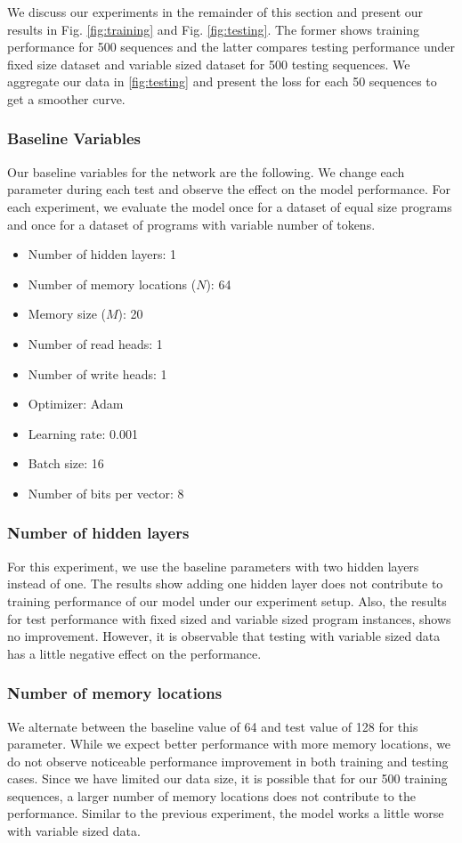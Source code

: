 \documentclass[acmsmall]{acmart}
\begin{document}
We discuss our experiments in the remainder of this section and present our results in Fig. \ref{fig:training} and Fig. \ref{fig:testing}. The former shows training performance for 500 sequences and the latter compares testing performance under fixed size dataset and variable sized dataset for 500 testing sequences. We aggregate our data in \ref{fig:testing} and present the loss for each 50 sequences to get a smoother curve.

\subsubsection{Baseline Variables}
Our baseline variables for the network are the following. We change each parameter during each test and observe the effect on the model performance. For each experiment, we evaluate the model once for a dataset of equal size programs and once for a dataset of programs with variable number of tokens.

\begin{itemize}
	\item Number of hidden layers: 1
	\item Number of memory locations ($N$): 64
	\item Memory size ($M$): 20
	\item Number of read heads: 1
	\item Number of write heads: 1
	\item Optimizer: Adam
	\item Learning rate: 0.001
	\item Batch size: 16
	\item Number of bits per vector: 8
\end{itemize}

\subsubsection{Number of hidden layers}
For this experiment, we use the baseline parameters with two hidden layers instead of one. The results show adding one hidden layer does not contribute to training performance of our model under our experiment setup. Also, the results for test performance with fixed sized and variable sized program instances, shows no improvement. However, it is observable that testing with variable sized data has a little negative effect on the performance.

\subsubsection{Number of memory locations}
We alternate between the baseline value of 64 and test value of 128 for this parameter. While we expect better performance with more memory locations, we do not observe noticeable performance improvement in both training and testing cases. Since we have limited our data size, it is possible that for our 500 training sequences, a larger number of memory locations does not contribute to the performance. Similar to the previous experiment, the model works a little worse with variable sized data.
\end{document}
